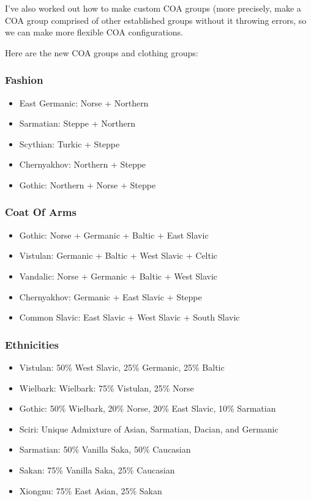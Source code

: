 \documentclass{article}
\begin{document}
	I’ve also worked out how to make custom COA groups (more precisely, make a COA group comprised of other established groups without it throwing errors, so we can make more flexible COA configurations.
	
	Here are the new COA groups and clothing groups:
	
	\subsubsection{Fashion}
	\begin{itemize}
		\item East Germanic: Norse + Northern
		\item Sarmatian: Steppe + Northern
		\item Scythian: Turkic + Steppe
		\item Chernyakhov: Northern + Steppe
		\item Gothic: Northern + Norse + Steppe
	\end{itemize}
	
	\subsubsection{Coat Of Arms}
	\begin{itemize}
		\item Gothic: Norse + Germanic + Baltic + East Slavic
		\item Vistulan: Germanic + Baltic + West Slavic + Celtic
		\item Vandalic: Norse + Germanic + Baltic + West Slavic
		\item Chernyakhov: Germanic + East Slavic + Steppe
		\item Common Slavic: East Slavic + West Slavic + South Slavic
	\end{itemize}
	
	\subsubsection{Ethnicities}
	\begin{itemize}
		\item Vistulan: 50\% West Slavic, 25\% Germanic, 25\% Baltic
		\item Wielbark: Wielbark: 75\% Vistulan, 25\% Norse
		\item Gothic: 50\% Wielbark, 20\% Norse, 20\% East Slavic, 10\% Sarmatian
		\item Sciri: Unique Admixture of Asian, Sarmatian, Dacian, and Germanic
		\item Sarmatian: 50\% Vanilla Saka, 50\% Caucasian
		\item Sakan: 75\% Vanilla Saka, 25\% Caucasian
		\item Xiongnu: 75\% East Asian, 25\% Sakan
	\end{itemize}
	
\end{document}
